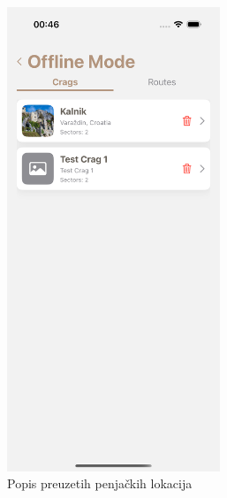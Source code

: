 \begin{figure}[H]
    \centering
    \begin{subfigure}[b]{0.4\textwidth}
        \centering
        \includegraphics[width=0.7\textwidth]{images/implementacija/offline-mode/crag-tab.png}
        \caption{Popis preuzetih penjačkih lokacija}
        \label{fig:offline_crag_tab}
    \end{subfigure}
    \hspace{0.08\textwidth}
    \begin{subfigure}[b]{0.4\textwidth}
        \centering

\end{subfigure}
\end{figure}
